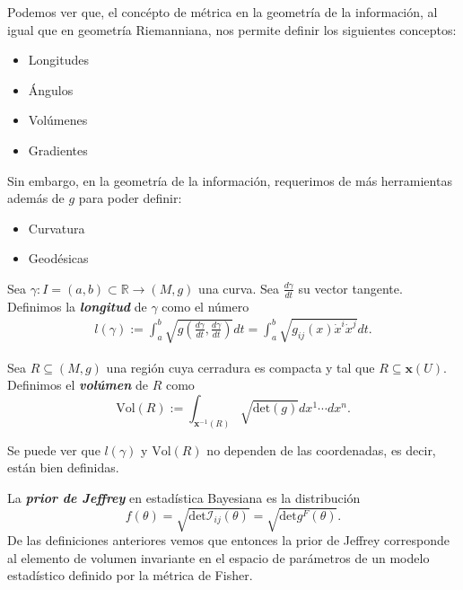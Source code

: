 \begin{observation}
Podemos ver que, el conc\'epto de m\'etrica en la geometr\'ia de la informaci\'on, al igual que en geometr\'ia Riemanniana, 
nos permite definir los siguientes conceptos:
\begin{itemize}
    \item Longitudes
    \item \'Angulos
    \item Vol\'umenes
    \item Gradientes
\end{itemize}
Sin embargo, en la geometr\'ia de la informaci\'on, requerimos de m\'as herramientas adem\'as de $g$ para poder definir:
\begin{itemize}
    \item Curvatura
    \item Geod\'esicas
\end{itemize}
\end{observation}

\begin{definition}
Sea $\gamma\colon I=(a,b)\subset\mathbb{R}\to(M,g)$ una curva. 
Sea $\frac{d\gamma}{dt}$ su vector tangente. Definimos la \textit{\textbf{longitud}} de $\gamma$ como el n\'umero
\begin{align*}
    l(\gamma):=\int_a^b\sqrt{g\left(\frac{d\gamma}{dt},\frac{d\gamma}{dt}\right)}dt=\int_a^b\sqrt{g_{ij}(x)\dot{x}^i\dot{x}^j}dt.
\end{align*}
\end{definition}

\begin{definition}
Sea $R\subseteq(M,g)$ una regi\'on cuya cerradura es compacta y tal que $R\subseteq\mathbf{x}(U)$. Definimos el \textit{\textbf{vol\'umen}} de $R$ como 
\begin{equation*}
    \text{Vol}(R):=\int_{\mathbf{x}^{-1}(R)}\sqrt{\text{det}(g)}dx^1\cdots dx^n.
\end{equation*}
\end{definition}

\begin{observation}
Se puede ver que $l(\gamma)$ y $\text{Vol}(R)$ no dependen de las coordenadas, es decir, est\'an bien definidas.     
\end{observation}

\begin{example}
La \textit{\textbf{prior de Jeffrey}} en estad\'istica Bayesiana es la distribuci\'on
\begin{equation*}
    f(\theta)=\sqrt{\text{det}\mathcal{I}_{ij}(\theta)}=\sqrt{\text{det}g^F(\theta)}.
\end{equation*}
De las definiciones anteriores vemos que entonces la prior de Jeffrey corresponde al elemento de
volumen invariante en el espacio de par\'ametros de un modelo estad\'istico definido por la m\'etrica de Fisher.
\end{example}

